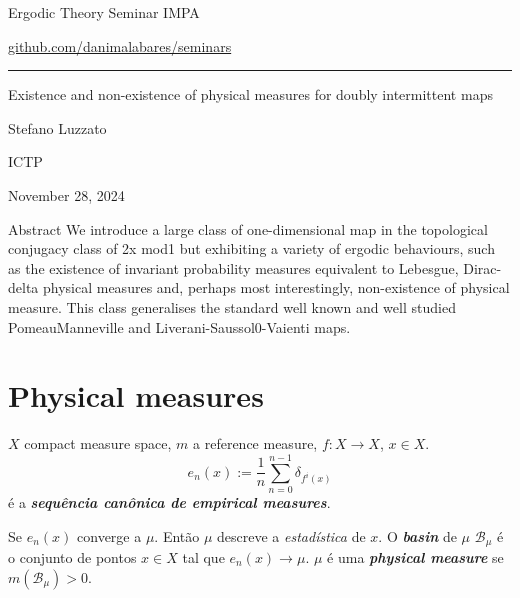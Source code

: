 


\begin{minipage}{\textwidth}
	\begin{minipage}{1\textwidth}
		Ergodic Theory Seminar \hfill IMPA
		
		{\small\hfill\href{https://github.com/danimalabares/seminars}{github.com/danimalabares/seminars}}

		
	\end{minipage}
\end{minipage}\vspace{.2cm}\hrule

\vspace{10pt}

{\Huge Existence and non-existence of physical measures for doubly intermittent maps}


\hfill{\Large Stefano Luzzato
}

{\Large \hfill ICTP}

\hfill{\large November 28, 2024}

\begin{thing4}{Abstract}\leavevmode
We introduce a large class of one-dimensional map in
the topological conjugacy class of 2x mod1 but exhibiting a variety
of ergodic behaviours, such as the existence of invariant probability
measures equivalent to Lebesgue, Dirac-delta physical measures and,
perhaps most interestingly, non-existence of physical measure. This
class generalises the standard well known and well studied PomeauManneville and Liverani-Saussol0-Vaienti maps.
\end{thing4}

\tableofcontents

\section{Physical measures}

$X$ compact measure space, $m$ a reference measure, $f:X \to X$, $x \in X$.
\[e_n(x):=\frac{1}{n}\sum_{n=0}^{n-1}\delta_{f^i(x)}\]
é a \textit{\textbf{sequência canônica de empirical measures}}.

Se $e_n(x)$ converge a $\mu$. Então $\mu$ descreve a \textit{estadística}  de $x$. O \textit{\textbf{basin}} de $\mu$ $\mathcal{B}_\mu$ é o conjunto de pontos $x \in X$ tal que $e_n(x)\to \mu$. $\mu$ é uma \textit{\textbf{physical measure}} se $m(\mathcal{B}_{\mu})>0$.


